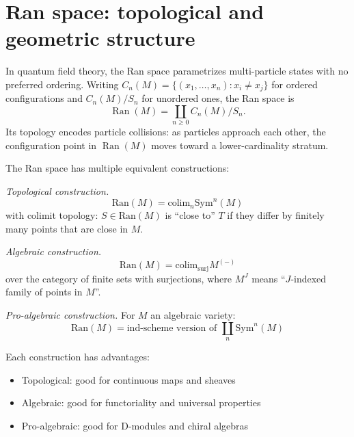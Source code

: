 \section{Ran space: topological and geometric structure}
\label{sec:ran-space-complete}

\begin{remark}
In quantum field theory, the Ran space parametrizes multi-particle states
with no preferred ordering.  Writing $C_n(M) = \{(x_1, \ldots, x_n) : x_i \neq x_j\}$
for ordered configurations and $C_n(M)/S_n$ for unordered ones, the Ran space is
\[\operatorname{Ran}(M) = \coprod_{n \geq 0} C_n(M)/S_n.\]
Its topology encodes particle collisions: as particles approach each other, the
configuration point in $\operatorname{Ran}(M)$ moves toward a lower-cardinality stratum.
\end{remark}

\begin{construction}
The Ran space has multiple equivalent constructions:

\emph{Topological construction.}
\[\text{Ran}(M) = \text{colim}_{n} \text{Sym}^n(M)\]
with colimit topology: $S \in \text{Ran}(M)$ is ``close to'' $T$ if they differ by 
finitely many points that are close in $M$.

\emph{Algebraic construction.}
\[\text{Ran}(M) = \text{colim}_{\text{surj}} M^{(-)}\]
over the category of finite sets with surjections, where $M^J$ means ``$J$-indexed 
family of points in $M$''.

\emph{Pro-algebraic construction.}
For $M$ an algebraic variety:
\[\text{Ran}(M) = \text{ind-scheme version of } \coprod_{n} \text{Sym}^n(M)\]

Each construction has advantages:
\begin{itemize}
\item Topological: good for continuous maps and sheaves
\item Algebraic: good for functoriality and universal properties
\item Pro-algebraic: good for D-modules and chiral algebras
\end{itemize}
\end{construction}

